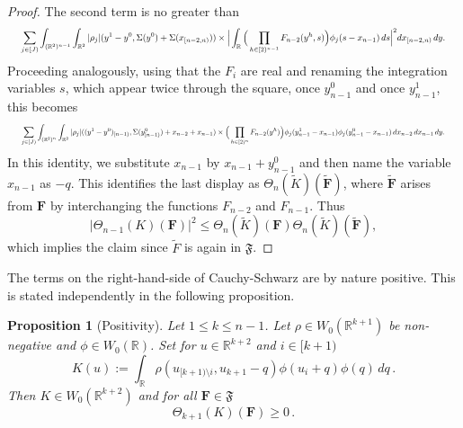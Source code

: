 \documentclass[12pt,reqno]{amsart}
\theoremstyle{plain}
\newtheorem{proposition}[theorem]{Proposition}
\numberwithin{equation}{section}
\theoremstyle{remark}
\newcommand{\R}{{\mathbb R}}
\newcommand{\F}{\mathbf{F}}
\begin{document}
\begin{proof}
The second term is no greater than
\begin{equation}
\resizebox{0.98\textwidth}{!}{$\displaystyle \sum_{j\in[J)} \int_{(\R^2)^{n-1}} \int_{\R^2} |\rho_j|(y^1-y^0, \Sigma(y^0)+\Sigma(x_{[n-2,n)})) \times \Big| \int_{\R} \Big(\prod_{h\in [2)^{n-1}} F_{n-2}(y^h,s)\Big) \phi_j(s-x_{n-1})\,ds \Big|^2 dx_{[n-2,n)}\,dy .$}
\end{equation}
Proceeding analogously, using that the $F_i$ are real and renaming the integration variables $s$, which appear twice
through the square, once $y_{n-1}^0$ and once $y_{n-1}^1$, this becomes
\begin{equation}
\resizebox{0.98\textwidth}{!}{$\displaystyle \sum_{j\in[J)} \int_{(\R^2)^n}\int_{\R^2} |\rho_j|((y^1-y^0)_{[n-1)},\Sigma(y^0_{[n-1)})+x_{n-2}+x_{n-1}) \times \Big(\prod_{h\in[2)^n}F_{n-2}(y^h)\Big) \phi_j(y_{n-1}^1-x_{n-1})\phi_j(y_{n-1}^0-x_{n-1}) \,dx_{n-2}\,dx_{n-1}\,dy .$}
\end{equation}
In this identity, we substitute $x_{n-1}$ by $x_{n-1}+y_{n-1}^0$ and then name the variable $x_{n-1}$ as $-q$.
This identifies the last display as $\Theta_n(\tilde K)(\mathbf{\tilde F})$, where $\mathbf{\tilde F}$ arises from $\F$ by interchanging the functions $F_{n-2}$ and $F_{n-1}$.
Thus
\begin{equation}
    |\Theta_{n-1}(K)(\F)|^2
    \le \Theta_n(\tilde K)(\F)\Theta_n(\tilde K)(\mathbf{\tilde F}),
\end{equation}
which implies the claim since $\tilde{F}$ is again in $\mathfrak{F}$.
\end{proof}

The terms on the right-hand-side of Cauchy-Schwarz are by nature positive. This is
stated independently in the following proposition.
\begin{proposition}[Positivity]\label{Positivity K}
 Let $1\le k\le n-1$. Let $\rho\in W_0(\R^{k+1})$ be non-negative and
$\phi\in W_0(\R)$. Set for $u\in\R^{k+2}$ and $i\in [k+1)$
\begin{equation}\label{auto:positive-kernel-K}
    K(u):=\int_\R \rho(u_{[k+1)\setminus i}, u_{k+1}-q) \phi(u_{i}+q) \phi(q) \, dq\, .
\end{equation}
Then $K\in W_0(\R^{k+2})$ and for all $\mathbf{F}\in\mathfrak{F}$
\begin{equation}\label{auto:positive-K-form}
    \Theta_{k+1}(K)(\F)\ge 0\, .
\end{equation}
\end{proposition}
\end{document}
